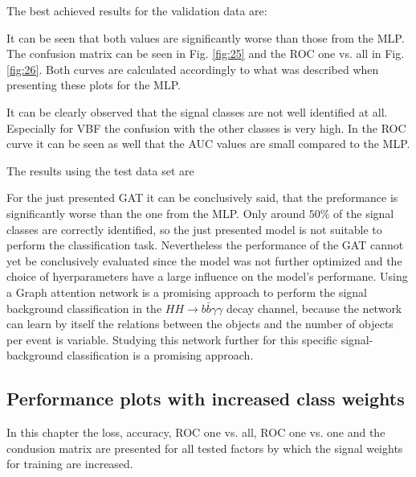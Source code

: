 The best achieved results for the validation data are:


It can be seen that both values are significantly worse than those from the MLP. The confusion matrix can be seen in Fig. \ref{fig:25} and the ROC one vs. all in Fig. \ref{fig:26}. Both curves are calculated
accordingly to what was described when presenting these plots for the MLP.


It can be clearly observed that the signal classes are not well identified at all. Especially for VBF the confusion with the other classes is very high. In the ROC curve it can be seen
as well that the AUC values are small compared to the MLP.

The results using the test data set are 

For the just presented GAT it can be conclusively said, that the preformance is significantly worse than the one from the MLP. Only around $50 \%$ of the signal classes are correctly identified, so the
just presented model is not suitable to perform the classification task.
Nevertheless the performance of the GAT cannot yet be conclusively evaluated since the model was not further optimized and the choice of hyerparameters have a large influence on the model's performane.
Using a Graph attention network is a promising approach to perform the signal background classification in the $HH \rightarrow b \bar{b} \gamma \gamma$ decay channel, because the network can learn by itself
the relations between the objects and the number of objects per event is variable. Studying this network further for this specific signal-background classification is a promising approach.

\subsection*{Performance plots with increased class weights}

In this chapter the loss, accuracy, ROC one vs. all, ROC one vs. one and the condusion matrix are presented for all tested factors by which the signal weights for training are increased.

